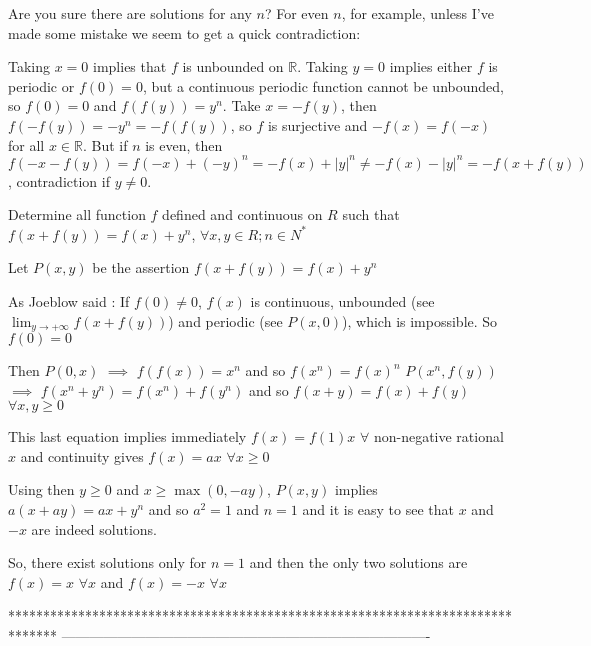 \begin{solution}
	Are you sure there are solutions for any $ n$?  For even $ n$, for example, unless I've made some mistake we seem to get a quick contradiction:

Taking $ x=0$ implies that $ f$ is unbounded on $ \mathbb{R}$.  Taking $ y=0$ implies either $ f$ is periodic or $ f(0)=0$, but a continuous periodic function cannot be unbounded, so $ f(0)=0$ and $ f(f(y))=y^n$.  Take $ x=-f(y)$, then $ f(-f(y))=-y^n=-f(f(y))$, so $ f$ is surjective and $ -f(x)=f(-x)$ for all $ x\in \mathbb{R}$.  But if $ n$ is even, then $ f(-x-f(y))=f(-x)+(-y)^n=-f(x)+|y|^n\neq -f(x)-|y|^n=-f(x+f(y))$, contradiction if $ y\neq 0$.
\end{solution}



\begin{solution}
	\begin{tcolorbox}Determine all function $ f$ defined and continuous on $ R$ such that
$ f(x + f(y)) = f(x) + y^n$, $ \forall x,y \in R; n \in N^*$\end{tcolorbox}

Let $ P(x,y)$ be the assertion $ f(x + f(y)) = f(x) + y^n$

As Joeblow said : If $ f(0)\ne 0$, $ f(x)$ is continuous, unbounded (see $ \lim_{y\to+\infty}f(x+f(y))$) and periodic (see $ P(x,0)$), which is impossible. So $ f(0)=0$

Then $ P(0,x)$ $ \implies$ $ f(f(x))=x^n$ and so $ f(x^n)=f(x)^n$
$ P(x^n,f(y))$ $ \implies$ $ f(x^n+y^n)=f(x^n)+f(y^n)$ and so $ f(x+y)=f(x)+f(y)$ $ \forall x,y\ge 0$

This last equation implies immediately $ f(x)=f(1)x$ $ \forall$ non-negative rational $ x$ and continuity gives $ f(x)=ax$ $ \forall x\ge 0$

Using then $ y\ge 0$ and $ x\ge\max(0,-ay)$, $ P(x,y)$ implies $ a(x+ay)=ax+y^n$ and so $ a^2=1$ and $ n=1$ and it is easy to see that $ x$ and $ -x$ are indeed solutions.

So, there exist solutions only for $ n=1$ and then the only two solutions are $ f(x)=x$ $ \forall x$ and $ f(x)=-x$ $ \forall x$
\end{solution}
*******************************************************************************
-------------------------------------------------------------------------------

